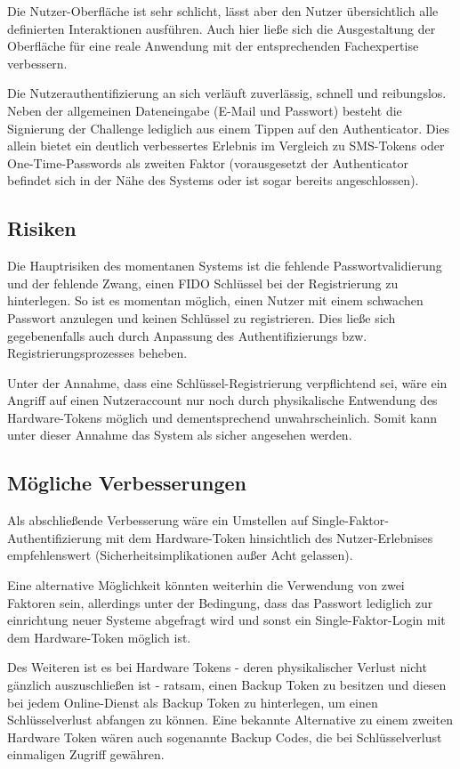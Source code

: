 \documentclass[journal]{IEEEtran}
\begin{document}
Die Nutzer-Oberfläche ist sehr schlicht, lässt aber den Nutzer übersichtlich
alle definierten Interaktionen ausführen. Auch hier ließe sich die
Ausgestaltung der Oberfläche für eine reale Anwendung mit der entsprechenden
Fachexpertise verbessern.

Die Nutzerauthentifizierung an sich verläuft zuverlässig, schnell und
reibungslos. Neben der allgemeinen Dateneingabe (E-Mail und Passwort) besteht
die Signierung der Challenge lediglich aus einem Tippen auf den Authenticator.
Dies allein bietet ein deutlich verbessertes Erlebnis im Vergleich zu
SMS-Tokens oder One-Time-Passwords als zweiten Faktor (vorausgesetzt der
Authenticator befindet sich in der Nähe des Systems oder ist sogar bereits
angeschlossen).

\subsection{Risiken}

Die Hauptrisiken des momentanen Systems ist die fehlende Passwortvalidierung
und der fehlende Zwang, einen FIDO Schlüssel bei der Registrierung zu
hinterlegen. So ist es momentan möglich, einen Nutzer mit einem schwachen
Passwort anzulegen und keinen Schlüssel zu registrieren. Dies ließe sich
gegebenenfalls auch durch Anpassung des Authentifizierungs bzw.
Registrierungsprozesses beheben.

Unter der Annahme, dass eine Schlüssel-Registrierung verpflichtend sei, wäre
ein Angriff auf einen Nutzeraccount nur noch durch physikalische Entwendung des
Hardware-Tokens möglich und dementsprechend unwahrscheinlich. Somit kann unter
dieser Annahme das System als sicher angesehen werden.

\subsection{Mögliche Verbesserungen}

Als abschließende Verbesserung wäre ein Umstellen auf
Single-Faktor-Authentifizierung mit dem Hardware-Token hinsichtlich des
Nutzer-Erlebnises empfehlenswert (Sicherheitsimplikationen außer Acht
gelassen). 

Eine alternative Möglichkeit könnten weiterhin die Verwendung von zwei Faktoren
sein, allerdings unter der Bedingung, dass das Passwort lediglich zur
einrichtung neuer Systeme abgefragt wird und sonst ein Single-Faktor-Login mit
dem Hardware-Token möglich ist.

Des Weiteren ist es bei Hardware Tokens - deren physikalischer Verlust nicht
gänzlich auszuschließen ist - ratsam, einen Backup Token zu besitzen und diesen
bei jedem Online-Dienst als Backup Token zu hinterlegen, um einen
Schlüsselverlust abfangen zu können. Eine bekannte Alternative zu einem zweiten
Hardware Token wären auch sogenannte Backup Codes, die bei Schlüsselverlust
einmaligen Zugriff gewähren.
\end{document}
